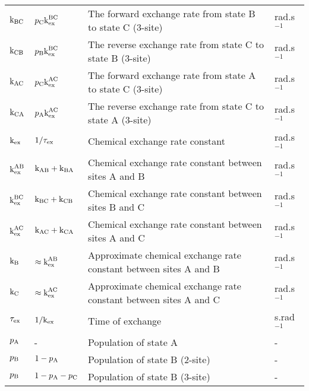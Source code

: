\begin{landscape}
\begin{center}
\begin{small}
\begin{longtable}{llll}
$\textrm{k}_\textrm{BC}$             & $p_\textrm{C}\textrm{k}_\textrm{ex}^\textrm{BC}$                    & The forward exchange rate from state B to state C (3-site)                    & rad.s$^{-1}$ \\
$\textrm{k}_\textrm{CB}$             & $p_\textrm{B}\textrm{k}_\textrm{ex}^\textrm{BC}$                    & The reverse exchange rate from state C to state B (3-site)                    & rad.s$^{-1}$ \\
$\textrm{k}_\textrm{AC}$             & $p_\textrm{C}\textrm{k}_\textrm{ex}^\textrm{AC}$                    & The forward exchange rate from state A to state C (3-site)                    & rad.s$^{-1}$ \\
$\textrm{k}_\textrm{CA}$             & $p_\textrm{A}\textrm{k}_\textrm{ex}^\textrm{AC}$                    & The reverse exchange rate from state C to state A (3-site)                    & rad.s$^{-1}$ \\
$\textrm{k}_\textrm{ex}$             & $1 / \tau_\textrm{ex}$                     & Chemical exchange rate constant                                               & rad.s$^{-1}$ \\
$\textrm{k}_\textrm{ex}^\textrm{AB}$           & $\textrm{k}_\textrm{AB} + \textrm{k}_\textrm{BA}$                  & Chemical exchange rate constant between sites A and B                         & rad.s$^{-1}$ \\
$\textrm{k}_\textrm{ex}^\textrm{BC}$           & $\textrm{k}_\textrm{BC} + \textrm{k}_\textrm{CB}$                  & Chemical exchange rate constant between sites B and C                         & rad.s$^{-1}$ \\
$\textrm{k}_\textrm{ex}^\textrm{AC}$           & $\textrm{k}_\textrm{AC} + \textrm{k}_\textrm{CA}$                  & Chemical exchange rate constant between sites A and C                         & rad.s$^{-1}$ \\
$\textrm{k}_\textrm{B}$              & $\approx \textrm{k}_\textrm{ex}^\textrm{AB}$               & Approximate chemical exchange rate constant between sites A and B             & rad.s$^{-1}$ \\
$\textrm{k}_\textrm{C}$              & $\approx \textrm{k}_\textrm{ex}^\textrm{AC}$               & Approximate chemical exchange rate constant between sites A and C             & rad.s$^{-1}$ \\
$\tau_\textrm{ex}$             & $1 / \textrm{k}_\textrm{ex}$                     & Time of exchange                                                              & s.rad$^{-1}$ \\
$p_\textrm{A}$              & -                              & Population of state A                                                         & - \\
$p_\textrm{B}$              & $1-p_\textrm{A}$                        & Population of state B (2-site)                                                & - \\
$p_\textrm{B}$              & $1-p_\textrm{A}-p_\textrm{C}$                    & Population of state B (3-site)                                                & - \\

\end{longtable}
\end{small}
\end{center}
\end{landscape}

